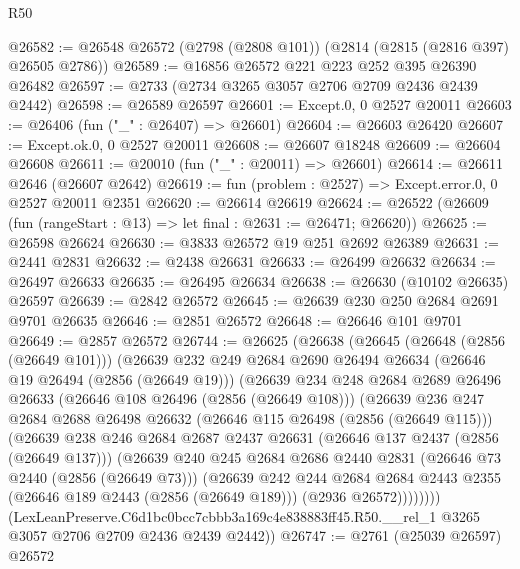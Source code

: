 \begin{lexlean}{R50}
\begin{coremodule}
@26582 := @26548 @26572 (@2798 (@2808 @101)) (@2814 (@2815 (@2816 @397) @26505 @2786))
@26589 := @16856 @26572 @221 @223 @252 @395 @26390 @26482
@26597 := @2733 (@2734 @3265 @3057 @2706 @2709 @2436 @2439 @2442)
@26598 := @26589 @26597
@26601 := Except.{0, 0} @2527 @20011
@26603 := @26406 (fun ("_" : @26407) => @26601)
@26604 := @26603 @26420
@26607 := Except.ok.{0, 0} @2527 @20011
@26608 := @26607 @18248
@26609 := @26604 @26608
@26611 := @20010 (fun ("_" : @20011) => @26601)
@26614 := @26611 @2646 (@26607 @2642)
@26619 := fun (problem : @2527) => Except.error.{0, 0} @2527 @20011 @2351
@26620 := @26614 @26619
@26624 := @26522 (@26609 (fun (rangeStart : @13) => let final : @2631 := @26471; @26620))
@26625 := @26598 @26624
@26630 := @3833 @26572 @19 @251 @2692 @26389
@26631 := @2441 @2831
@26632 := @2438 @26631
@26633 := @26499 @26632
@26634 := @26497 @26633
@26635 := @26495 @26634
@26638 := @26630 (@10102 @26635) @26597
@26639 := @2842 @26572
@26645 := @26639 @230 @250 @2684 @2691 @9701 @26635
@26646 := @2851 @26572
@26648 := @26646 @101 @9701
@26649 := @2857 @26572
@26744 := @26625
    (@26638
      (@26645
        (@26648 (@2856 (@26649 @101)))
        (@26639
          @232
          @249
          @2684
          @2690
          @26494
          @26634
          (@26646 @19 @26494 (@2856 (@26649 @19)))
          (@26639
            @234
            @248
            @2684
            @2689
            @26496
            @26633
            (@26646 @108 @26496 (@2856 (@26649 @108)))
            (@26639
              @236
              @247
              @2684
              @2688
              @26498
              @26632
              (@26646 @115 @26498 (@2856 (@26649 @115)))
              (@26639
                @238
                @246
                @2684
                @2687
                @2437
                @26631
                (@26646 @137 @2437 (@2856 (@26649 @137)))
                (@26639
                  @240
                  @245
                  @2684
                  @2686
                  @2440
                  @2831
                  (@26646 @73 @2440 (@2856 (@26649 @73)))
                  (@26639
                    @242
                    @244
                    @2684
                    @2684
                    @2443
                    @2355
                    (@26646 @189 @2443 (@2856 (@26649 @189)))
                    (@2936 @26572))))))))
      (LexLeanPreserve.C6d1bc0bcc7cbbb3a169c4e838883ff45.R50.__rel_1
        @3265
        @3057
        @2706
        @2709
        @2436
        @2439
        @2442))
@26747 := @2761 (@25039 @26597) @26572

\end{coremodule}
\end{lexlean}
